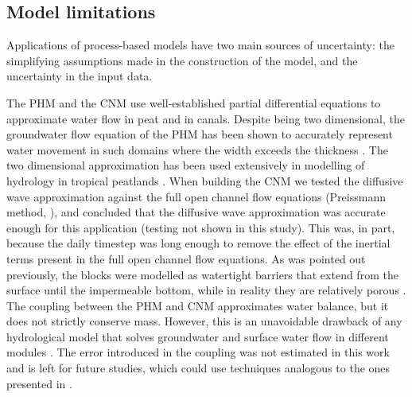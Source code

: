 \documentclass[bg, manuscript]{copernicus}
\begin{document}
\subsection{Model limitations}

Applications of process-based models have two main sources of uncertainty: the simplifying assumptions made in the construction of the model, and the uncertainty in the input data.

The PHM and the CNM use well-established partial differential equations to approximate water flow in peat and in canals.
Despite being two dimensional, the groundwater flow equation of the PHM has been shown to accurately represent water movement in such domains where the width exceeds the thickness \citep{connortonDoesRegionalGroundwaterflow1985}.
The two dimensional approximation has been used extensively in modelling of hydrology in tropical peatlands \citep{bairdDigiBogPeatlandDevelopment2012, cobbHowTemporalPatterns2017}.
When building the CNM we tested the diffusive wave approximation against the full open channel flow equations (Preissmann method, \cite{cungePracticalAspectsComputational1980, haahtiUnsteadyFlowSimulation2014}), and concluded that the diffusive wave approximation was accurate enough for this application (testing not shown in this study). 
This was, in part, because the daily timestep was long enough to remove the effect of the inertial terms present in the full open channel flow equations.
As was pointed out previously, the blocks were modelled as watertight barriers that extend from the surface until the impermeable bottom, while in reality they are relatively porous \citep{osakiTropicalPeatlandEcosystems2016, ritzemaCanalBlockingStrategies2014}.
The coupling between the PHM and CNM approximates water balance, but it does not strictly conserve mass.
However, this is an unavoidable drawback of any hydrological model that solves groundwater and surface water flow in different modules \citep{barthelGroundwaterSurfaceWater2016}. 
The error introduced in the coupling was not estimated in this work and is left for future studies, which could use techniques analogous to the ones presented in \cite{gasda2011}.
\end{document}
